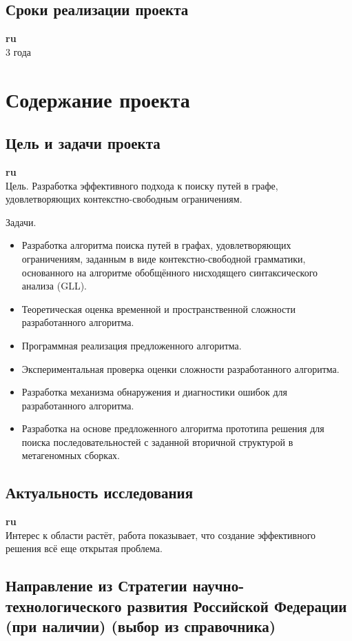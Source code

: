 \documentclass[12pt]{article}  %
\theoremstyle{remark}
\begin{document}
\subsection{Сроки реализации проекта}

\textbf{ru}\\
3 года

\section{Содержание проекта}

\subsection{Цель и задачи проекта}

\textbf{ru}\\
Цель.
Разработка эффективного подхода к поиску путей в графе, удовлетворяющих контекстно-свободным ограничениям.

Задачи.
\begin{itemize}
\item Разработка алгоритма поиска путей в графах, удовлетворяющих ограничениям, заданным в виде контекстно-свободной грамматики, основанного на алгоритме обобщённого нисходящего синтаксического анализа (GLL).
\item Теоретическая оценка временной и пространственной сложности разработанного алгоритма.
\item Программная реализация предложенного алгоритма.
\item Экспериментальная проверка оценки сложности разработанного алгоритма.
\item Разработка механизма обнаружения и диагностики ошибок для разработанного алгоритма.
\item Разработка на основе предложенного алгоритма прототипа решения для поиска последовательностей с заданной вторичной структурой в метагеномных сборках.
\end{itemize}

\subsection{Актуальность исследования}

\textbf{ru}\\
Интерес к области растёт, работа показывает, что создание эффективного решения всё еще открытая проблема.

\subsection{Направление из Стратегии научно-технологического развития Российской Федерации (при наличии) (выбор из справочника)}
\end{document}
